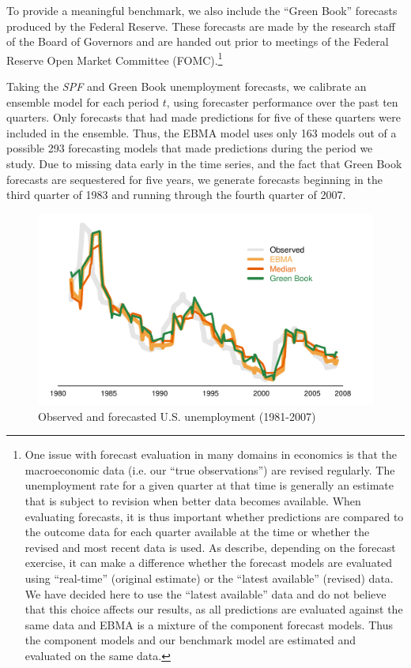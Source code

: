 \documentclass[12pt,fullpage,endnotes]{article}
\begin{document}
To provide a meaningful benchmark, we also include the ``Green Book''
forecasts produced by the Federal Reserve. These forecasts are made by
the research staff of the Board of Governors and are handed out prior
to meetings of the Federal Reserve Open Market Committee
(FOMC).\footnote{One issue with forecast evaluation in many domains in
  economics is that the macroeconomic data (i.e. our ``true
  observations'') are revised regularly. The unemployment rate for a
  given quarter at that time is generally an estimate that is subject
  to revision when better data becomes available. When evaluating
  forecasts, it is thus important whether predictions are compared to
  the outcome data for each quarter available at the time or whether
  the revised and most recent data is used. As
  \citet{Croushore:Stark:2001} describe, depending on the forecast
  exercise, it can make a difference whether the forecast models are
  evaluated using ``real-time'' (original estimate) or the ``latest
  available'' (revised) data. We have decided here to use the ``latest
  available'' data and do not believe that this choice affects our results, as all predictions are evaluated against the same data
  and EBMA is a mixture of the component forecast models. Thus the
  component models and our benchmark model are estimated and evaluated
  on the same data.} %

Taking the \textit{SPF} and Green Book unemployment forecasts, we
calibrate an ensemble model for each period $t$, using forecaster
performance over the past ten quarters.  Only forecasts that had made
predictions for five of these quarters were included in the ensemble.
Thus, the EBMA model uses only 163 models out of a possible 293
forecasting models that made predictions during the period we study.
Due to missing data early in the time series, and the fact that Green
Book forecasts are sequestered for five years, we generate forecasts
beginning in the third quarter of 1983 and running through the fourth
quarter of 2007.



\begin{figure}[h]
\caption{Observed and forecasted U.S. unemployment (1981-2007)}
\label{timeSeries}
\begin{center}
\includegraphics[scale=.8]{mdwtimeSeries2}
\end{center}
\end{figure}
\end{document}
